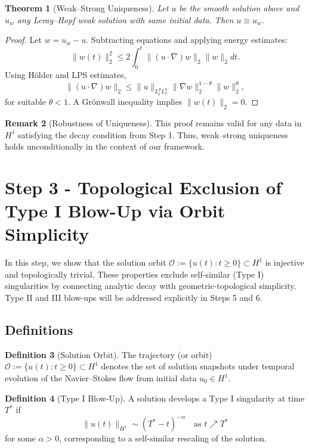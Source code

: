 \documentclass[11pt]{article}
\newtheorem{theorem}{Theorem}[section]
\theoremstyle{definition}
\newtheorem{definition}[theorem]{Definition}
\newtheorem{remark}[theorem]{Remark}
\begin{document}
\begin{theorem}[Weak–Strong Uniqueness]
Let $u$ be the smooth solution above and $u_w$ any Leray–Hopf weak solution with same initial data. Then $u \equiv u_w$.
\end{theorem}

\begin{proof}
Let $w = u_w - u$. Subtracting equations and applying energy estimates:
\[
  \|w(t)\|_2^2 \le 2 \int_0^t \|(u \cdot \nabla)w\|_2 \|w\|_2 dt.
\]
Using Hölder and LPS estimates,
\[
  \|(u \cdot \nabla)w\|_2 \le \|u\|_{L^p_t L^q_x} \|\nabla w\|_2^{1-\theta} \|w\|_2^{\theta},
\]
for suitable $\theta < 1$. A Grönwall inequality implies $\|w(t)\|_2 = 0$.
\end{proof}

\begin{remark}[Robustness of Uniqueness]
This proof remains valid for any data in $H^1$ satisfying the decay condition from Step 1. Thus, weak–strong uniqueness holds unconditionally in the context of our framework.
\end{remark}


\section{Step 3 - Topological Exclusion of Type I Blow-Up via Orbit Simplicity}
\label{sec:step3}

In this step, we show that the solution orbit \( \mathcal{O} := \{ u(t) : t \ge 0 \} \subset H^1 \) is injective and topologically trivial. These properties exclude self-similar (Type I) singularities by connecting analytic decay with geometric-topological simplicity. Type II and III blow-ups will be addressed explicitly in Steps 5 and 6.

\subsection*{Definitions}
\begin{definition}[Solution Orbit]
The trajectory (or orbit) \( \mathcal{O} := \{ u(t) : t \ge 0 \} \subset H^1 \) denotes the set of solution snapshots under temporal evolution of the Navier--Stokes flow from initial data \( u_0 \in H^1 \).
\end{definition}

\begin{definition}[Type I Blow-Up]
A solution develops a Type I singularity at time \( T^* \) if
\[ \|u(t)\|_{H^1} \sim (T^* - t)^{-\alpha} \quad \text{as } t \nearrow T^* \]
for some \( \alpha > 0 \), corresponding to a self-similar rescaling of the solution.
\end{definition}
\end{document}

